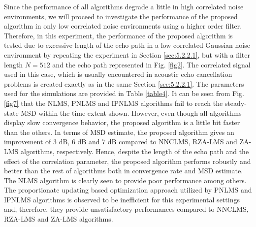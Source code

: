 \vspace{-0.5cm}
\par
\noindent Since the performance of all algorithms degrade a little in high correlated noise environments, we will proceed to investigate the performance of the proposed algorithm in only low correlated noise environments using a higher order filter. Therefore, in this experiment, the performance of the proposed algorithm is tested due to excessive length of the echo path in a low correlated Gaussian noise environment by repeating the experiment in Section \ref{sec:5.2.2.1}, but with a filter length $N=512$ and the echo path represented in Fig. \ref{fig2}. The correlated signal used in this case, which is usually encountered in acoustic echo cancellation problems is created exactly as in the same Section \ref{sec:5.2.2.1}. The parameters used for the simulations are provided in Table \ref{table4}. It can be seen from  Fig. \ref{fig7} that the NLMS, PNLMS and IPNLMS algorithms fail to reach the steady-state MSD within the time extent shown. However, even though all algorithms display slow convergence behavior, the proposed algorithm is a little bit faster than the others. In terms of MSD estimate, the proposed algorithm gives an improvement of 3 dB, 6 dB and 7 dB compared to NNCLMS, RZA-LMS and ZA-LMS algorithms, respectively. Hence, despite the length of the echo path and the effect of the correlation parameter, the proposed algorithm performs robustly and better than the rest of algorithms both in convergence rate and MSD estimate. The NLMS algorithm is clearly seen to provide poor performance among others. The proportionate updating based optimization approach utilized by PNLMS and IPNLMS algorithms is observed to be inefficient for this experimental settings and, therefore, they provide unsatisfactory performances compared to NNCLMS, RZA-LMS and ZA-LMS algorithms.


